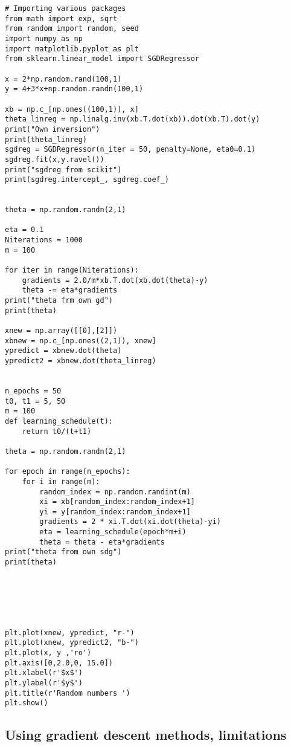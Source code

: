 \documentclass[%
oneside,                 %
final,                   %
10pt]{article}
\begin{document}
\begin{verbatim}
# Importing various packages
from math import exp, sqrt
from random import random, seed
import numpy as np
import matplotlib.pyplot as plt
from sklearn.linear_model import SGDRegressor

x = 2*np.random.rand(100,1)
y = 4+3*x+np.random.randn(100,1)

xb = np.c_[np.ones((100,1)), x]
theta_linreg = np.linalg.inv(xb.T.dot(xb)).dot(xb.T).dot(y)
print("Own inversion")
print(theta_linreg)
sgdreg = SGDRegressor(n_iter = 50, penalty=None, eta0=0.1)
sgdreg.fit(x,y.ravel())
print("sgdreg from scikit")
print(sgdreg.intercept_, sgdreg.coef_)


theta = np.random.randn(2,1)

eta = 0.1
Niterations = 1000
m = 100

for iter in range(Niterations):
    gradients = 2.0/m*xb.T.dot(xb.dot(theta)-y)
    theta -= eta*gradients
print("theta frm own gd")
print(theta)

xnew = np.array([[0],[2]])
xbnew = np.c_[np.ones((2,1)), xnew]
ypredict = xbnew.dot(theta)
ypredict2 = xbnew.dot(theta_linreg)


n_epochs = 50
t0, t1 = 5, 50
m = 100
def learning_schedule(t):
    return t0/(t+t1)

theta = np.random.randn(2,1)

for epoch in range(n_epochs):
    for i in range(m):
        random_index = np.random.randint(m)
        xi = xb[random_index:random_index+1]
        yi = y[random_index:random_index+1]
        gradients = 2 * xi.T.dot(xi.dot(theta)-yi)
        eta = learning_schedule(epoch*m+i)
        theta = theta - eta*gradients
print("theta from own sdg")
print(theta)






plt.plot(xnew, ypredict, "r-")
plt.plot(xnew, ypredict2, "b-")
plt.plot(x, y ,'ro')
plt.axis([0,2.0,0, 15.0])
plt.xlabel(r'$x$')
plt.ylabel(r'$y$')
plt.title(r'Random numbers ')
plt.show()

\end{verbatim}



\subsection*{Using gradient descent methods, limitations}
\end{document}
